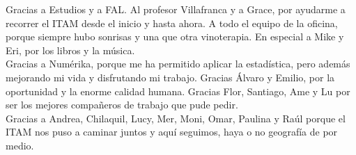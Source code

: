 Gracias a Estudios y a FAL. Al profesor Villafranca y a Grace, por ayudarme a recorrer el ITAM desde el inicio y hasta ahora. A todo el equipo de la oficina, porque siempre hubo sonrisas y una que otra vinoterapia. En especial a Mike y Eri, por los libros y la música.\\

Gracias a Numérika, porque me ha permitido aplicar la estadística, pero además mejorando mi vida y disfrutando mi trabajo. Gracias Álvaro y Emilio, por la oportunidad y la enorme calidad humana. Gracias Flor, Santiago, Ame y Lu por ser los mejores compañeros de trabajo que pude pedir.\\

Gracias a Andrea, Chilaquil, Lucy, Mer, Moni, Omar, Paulina y Raúl porque el ITAM nos puso a caminar juntos y aquí seguimos, haya o no geografía de por medio.



